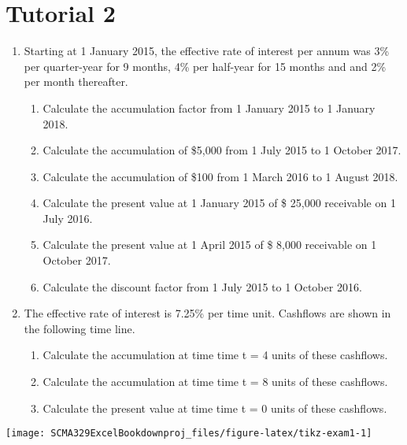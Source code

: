 \documentclass[
]{article}
\theoremstyle{definition}
\theoremstyle{definition}
\theoremstyle{definition}
\theoremstyle{definition}
\theoremstyle{remark}
\begin{document}
\hypertarget{tutorial-2}{%
\section{Tutorial 2}\label{tutorial-2}}

\begin{enumerate}
\def\labelenumi{\arabic{enumi}.}
\item
  Starting at 1 January 2015, the effective rate of interest per annum
  was 3\% per quarter-year for 9 months, 4\% per half-year for 15 months
  and and 2\% per month thereafter.

  \begin{enumerate}
  \def\labelenumii{\arabic{enumii}.}
  \item
    Calculate the accumulation factor from 1 January 2015 to 1
    January 2018.
  \item
    Calculate the accumulation of \$5,000 from 1 July 2015 to 1
    October 2017.
  \item
    Calculate the accumulation of \$100 from 1 March 2016 to 1
    August 2018.
  \item
    Calculate the present value at 1 January 2015 of \$ 25,000
    receivable on 1 July 2016.
  \item
    Calculate the present value at 1 April 2015 of \$ 8,000
    receivable on 1 October 2017.
  \item
    Calculate the discount factor from 1 July 2015 to 1
    October 2016.
  \end{enumerate}
\item
  The effective rate of interest is 7.25\% per time unit. Cashflows are
  shown in the following time line.

  \begin{enumerate}
  \def\labelenumii{\arabic{enumii}.}
  \item
    Calculate the accumulation at time time t = 4 units of these
    cashflows.
  \item
    Calculate the accumulation at time time t = 8 units of these
    cashflows.
  \item
    Calculate the present value at time time t = 0 units of these
    cashflows.
  \end{enumerate}
\end{enumerate}

\begin{center}\texttt{[image: SCMA329ExcelBookdownproj\_files/figure-latex/tikz-exam1-1]} \end{center}
\end{document}
